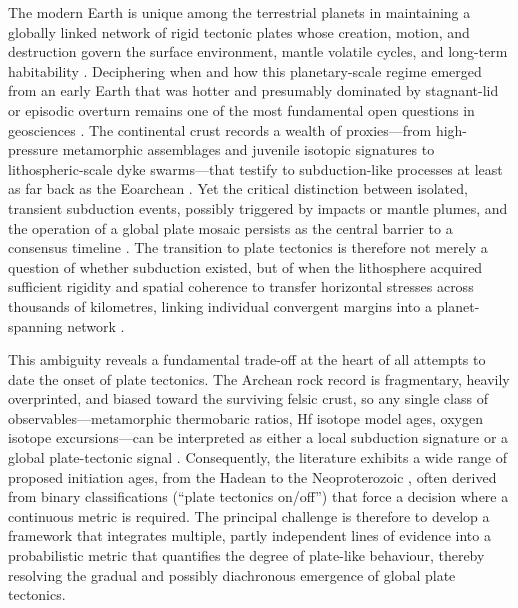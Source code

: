 \documentclass{article}
\begin{document}
The modern Earth is unique among the terrestrial planets in maintaining a globally linked network of rigid tectonic plates whose creation, motion, and destruction govern the surface environment, mantle volatile cycles, and long-term habitability \cite{kasting1993habitable,korenaga2017initiation}.  Deciphering when and how this planetary-scale regime emerged from an early Earth that was hotter and presumably dominated by stagnant-lid or episodic overturn remains one of the most fundamental open questions in geosciences \cite{stern2005evidence,debaille2013stagnant}.  The continental crust records a wealth of proxies—from high-pressure metamorphic assemblages and juvenile isotopic signatures to lithospheric-scale dyke swarms—that testify to subduction-like processes at least as far back as the Eoarchean \cite{hopkins2008low,cawood2006linking}.  Yet the critical distinction between isolated, transient subduction events, possibly triggered by impacts or mantle plumes, and the operation of a global plate mosaic persists as the central barrier to a consensus timeline \cite{vanHunen2011short,fischer2020temporal}.  The transition to plate tectonics is therefore not merely a question of whether subduction existed, but of when the lithosphere acquired sufficient rigidity and spatial coherence to transfer horizontal stresses across thousands of kilometres, linking individual convergent margins into a planet-spanning network \cite{brown2020evolution,hawkesworth2019tectonic}.

This ambiguity reveals a fundamental trade-off at the heart of all attempts to date the onset of plate tectonics.  The Archean rock record is fragmentary, heavily overprinted, and biased toward the surviving felsic crust, so any single class of observables—metamorphic thermobaric ratios, Hf isotope model ages, oxygen isotope excursions—can be interpreted as either a local subduction signature or a global plate-tectonic signal \cite{polat2003overview,vandervelden2012blueschists}.  Consequently, the literature exhibits a wide range of proposed initiation ages, from the Hadean \cite{harrison2005heterogeneous} to the Neoproterozoic \cite{stern2008modern}, often derived from binary classifications (“plate tectonics on/off”) that force a decision where a continuous metric is required.  The principal challenge is therefore to develop a framework that integrates multiple, partly independent lines of evidence into a probabilistic metric that quantifies the degree of plate-like behaviour, thereby resolving the gradual and possibly diachronous emergence of global plate tectonics.
\end{document}
